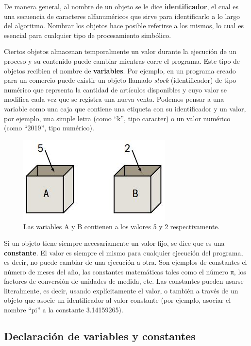 \documentclass[]{book}
\begin{document}
De manera general, al nombre de un objeto se le dice \textbf{identificador}, el cual es una secuencia de caracteres alfanuméricos que sirve para identificarlo a lo largo del algoritmo. Nombrar los objetos hace posible referirse a los mismos, lo cual es esencial para cualquier tipo de procesamiento simbólico.

Ciertos objetos almacenan temporalmente un valor durante la ejecución de un proceso y su contenido puede cambiar mientras corre el programa. Este tipo de objetos recibien el nombre de \textbf{variables}. Por ejemplo, en un programa creado para un comercio puede existir un objeto llamado \emph{stock} (identificador) de tipo numérico que reprsenta la cantidad de artículos disponibles y cuyo valor se modifica cada vez que se registra una nueva venta. Podemos pensar a una variable como una caja que contiene una etiqueta con su identificador y un valor, por ejemplo, una simple letra (como ``k'', tipo caracter) o un valor numérico (como ``2019'', tipo numérico).

\begin{figure}

{\centering \includegraphics[width=0.5\linewidth]{images/09_cajas} 

}

\caption{Las variables A y B contienen a los valores 5 y 2 respectivamente.}\label{fig:cajas}
\end{figure}

Si un objeto tiene siempre necesariamente un valor fijo, se dice que es una \textbf{constante}. El valor es siempre el mismo para cualquier ejecución del programa, es decir, no puede cambiar de una ejecución a otra. Son ejemplos de constantes el número de meses del año, las constantes matemáticas tales como el número π, los factores de conversión de unidades de medida, etc. Las constantes pueden usarse literalmente, es decir, usando explícitamente el valor, o también a través de un objeto que asocie un identificador al valor constante (por ejemplo, asociar el nombre ``pi'' a la constante 3.14159265).

\hypertarget{declaracion-de-variables-y-constantes}{%
\subsection{Declaración de variables y constantes}\label{declaracion-de-variables-y-constantes}}
\end{document}
